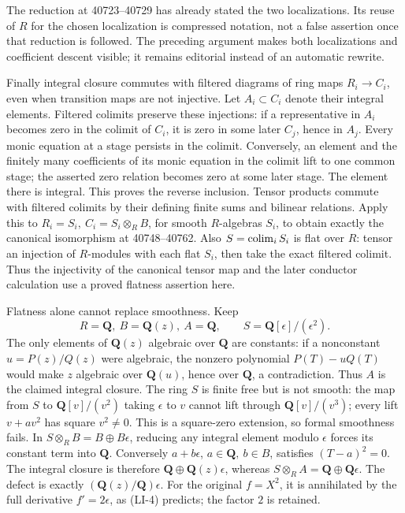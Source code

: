 The reduction at 40723--40729 has already stated the two localizations. Its reuse of \(R\) for the chosen localization is compressed notation, not a false assertion once that reduction is followed. The preceding argument makes both localizations and coefficient descent visible; it remains editorial instead of an automatic rewrite.

Finally integral closure commutes with filtered diagrams of ring maps \(R_i\to C_i\), even when transition maps are not injective. Let \(A_i\subset C_i\) denote their integral elements. Filtered colimits preserve these injections: if a representative in \(A_i\) becomes zero in the colimit of \(C_i\), it is zero in some later \(C_j\), hence in \(A_j\). Every monic equation at a stage persists in the colimit. Conversely, an element and the finitely many coefficients of its monic equation in the colimit lift to one common stage; the asserted zero relation becomes zero at some later stage. The element there is integral. This proves the reverse inclusion. Tensor products commute with filtered colimits by their defining finite sums and bilinear relations. Apply this to \(R_i=S_i,\ C_i=S_i\otimes_R B\), for smooth \(R\)-algebras \(S_i\), to obtain exactly the canonical isomorphism at 40748--40762. Also \(S=\mathop{\rm colim}_iS_i\) is flat over \(R\): tensor an injection of \(R\)-modules with each flat \(S_i\), then take the exact filtered colimit. Thus the injectivity of the canonical tensor map and the later conductor calculation use a proved flatness assertion here.

Flatness alone cannot replace smoothness. Keep \[
R=\mathbf Q,\ B=\mathbf Q(z),\ A=\mathbf Q,\qquad
S=\mathbf Q[\epsilon]/(\epsilon^2).
\] The only elements of \(\mathbf Q(z)\) algebraic over \(\mathbf Q\) are constants: if a nonconstant \(u=P(z)/Q(z)\) were algebraic, the nonzero polynomial \(P(T)-uQ(T)\) would make \(z\) algebraic over \(\mathbf Q(u)\), hence over \(\mathbf Q\), a contradiction. Thus \(A\) is the claimed integral closure. The ring \(S\) is finite free but is not smooth: the map from \(S\) to \(\mathbf Q[v]/(v^2)\) taking \(\epsilon\) to \(v\) cannot lift through \(\mathbf Q[v]/(v^3)\); every lift \(v+av^2\) has square \(v^2\ne0\). This is a square-zero extension, so formal smoothness fails. In \(S\otimes_RB=B\oplus B\epsilon\), reducing any integral element modulo \(\epsilon\) forces its constant term into \(\mathbf Q\). Conversely \(a+b\epsilon\), \(a\in\mathbf Q,\ b\in B\), satisfies \((T-a)^2=0\). The integral closure is therefore \(\mathbf Q\oplus\mathbf Q(z)\epsilon\), whereas \(S\otimes_RA=\mathbf Q\oplus\mathbf Q\epsilon\). The defect is exactly \((\mathbf Q(z)/\mathbf Q)\epsilon\). For the original \(f=X^2\), it is annihilated by the full derivative \(f'=2\epsilon\), as (LI-4) predicts; the factor \(2\) is retained.

